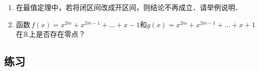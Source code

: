 \documentclass[a4paper,punct=CCT]{ctexbook}
\theoremstyle{definition}
\theoremstyle{remark}
\newif\ifshowex
\newif\ifshowsolp
\let\geq\geqslant
\let\ge\geq}
\begin{document}
\begin{enumerate}
\item 在最值定理中，若将闭区间改成开区间，则结论不再成立．请举例说明．

  \ifshowsolp
  其实对于定义在开区间\(\paren{0,1}\)上的恒等函数\(f(x) = x\)这样的简单函数，既取不到最小值，又取不到最大值．更不用说像定义在开区间上的\(\paren{-π/2,π/2}\)上的正切函数\(f(x) = \tan x\)和定义在开区间\(\paren{-∞,+∞}\)上的反正切函数\(f(x) = \arctan x\)了．
  \fi

\item 函数\(\,f(x) = x^{2m} + x^{2m-1} + \dots + x - 1\)和\(g(x) = x^{2m} + x^{2m-1} + \dots + x + 1\)在\(\R\)上是否存在零点？

  \ifshowsolp
  此处假定\(m \ge 1\)．函数\(f\)在\(\R\)上显然是有零点的；因为\(f(0) = -1\)且\(f(1) = 2m-1 > 0\)，由定理~\ref{thm:bolzano}可知它在\(\paren{-1,1}\)上至少有一个零点．函数\(f\)在\(\R\)上不存在零点，原因如下．有
  \begin{align*}
    g(x)
    &=
      \begin{dcases}
        1 + \sum_{k = 1}^{\smash{2m}} x^k, & x \ne 1, \\
        2m+1, & x = 1,
      \end{dcases} \\
    &=
      \begin{dcases}
        \frac{1-x^{2m+1}\negthickspace}{1-x}, & x \ne 1, \\
        2m+1, & x = 1.
      \end{dcases}
  \end{align*}
  可见函数\(g\)在\(\R\)上都是正数，因此无零点．
  \fi
\end{enumerate}

\ifshowex
{}
\subsection*{练习}
\end{document}
